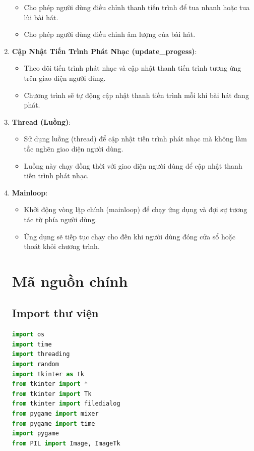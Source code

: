 \documentclass[a4paper]{article}
\begin{document}
\begin{enumerate}
    \begin{itemize}
        \item Cho phép người dùng điều chỉnh thanh tiến trình để tua nhanh hoặc tua lùi bài hát.
        \item Cho phép người dùng điều chỉnh âm lượng của bài hát.
    \end{itemize}
    \item \textbf{Cập Nhật Tiến Trình Phát Nhạc (update\_progess)}:
    \begin{itemize}
        \item Theo dõi tiến trình phát nhạc và cập nhật thanh tiến trình tương ứng trên giao diện người dùng.
        \item Chương trình sẽ tự động cập nhật thanh tiến trình mỗi khi bài hát đang phát.
    \end{itemize}
    \item \textbf{Thread (Luồng)}:
    \begin{itemize}
        \item Sử dụng luồng (thread) để cập nhật tiến trình phát nhạc mà không làm tắc nghẽn giao diện người dùng.
        \item Luồng này chạy đồng thời với giao diện người dùng để cập nhật thanh tiến trình phát nhạc.
    \end{itemize}
    \item \textbf{Mainloop}:
    \begin{itemize}
        \item Khởi động vòng lặp chính (mainloop) để chạy ứng dụng và đợi sự tương tác từ phía người dùng.
        \item Ứng dụng sẽ tiếp tục chạy cho đến khi người dùng đóng cửa sổ hoặc thoát khỏi chương trình.
    \end{itemize}
\section{Mã nguồn chính}
\subsection{Import thư viện}
\begin{mdframed}[hidealllines=true,backgroundcolor=magenta!10]
\begin{lstlisting}[language=Python]
import os
import time
import threading
import random
import tkinter as tk
from tkinter import *
from tkinter import Tk
from tkinter import filedialog
from pygame import mixer
from pygame import time
import pygame
from PIL import Image, ImageTk
\end{lstlisting}
\end{mdframed}


\end{enumerate}
\end{document}
